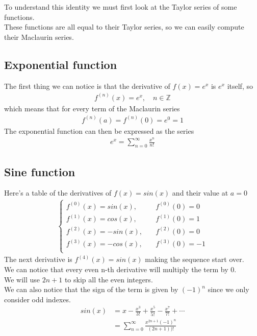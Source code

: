 \documentclass{article}
\begin{document}
To understand this identity we must first look at the Taylor series of some functions.
\\
These functions are all equal to their Taylor series, so we can easily compute their Maclaurin series.

\subsection{Exponential function}

The first thing we can notice is that the derivative of \(f(x)=e^x\) is \(e^x\) itself, so
\begin{align*}
	f^{(n)}(x)=e^x,
	\quad n\in\mathds{Z}
\end{align*}
which means that for every term of the Maclaurin series
\begin{align*}
	f^{(n)}(a)=f^{(n)}(0)=e^0=1
\end{align*}
The exponential function can then be expressed as the series
\begin{align*}
	e^x=\sum_{n=0}^{\infty}\frac{x^n}{n!}
\end{align*}

\pagebreak

\subsection{Sine function}

Here's a table of the derivatives of \(f(x)=sin(x)\) and their value at \(a=0\)
\begin{align*}
	\begin{cases}
		f^{(0)}(x)=sin(x), \quad &f^{(0)}(0)=0 \\
		f^{(1)}(x)=cos(x), \quad &f^{(1)}(0)=1 \\
		f^{(2)}(x)=-sin(x),\quad &f^{(2)}(0)=0 \\
		f^{(3)}(x)=-cos(x),\quad &f^{(3)}(0)=-1\\
	\end{cases}
\end{align*}
The next derivative is \(f^{(4)}(x)=sin(x)\) making the sequence start over.
\\
We can notice that every even n-th derivative will multiply the term by \(0\).
\\
We will use \(2n+1\) to skip all the even integers.
\\
We can also notice that the sign of the term is given by \((-1)^n\) since we only consider odd indexes.
\begin{align*}
	sin(x)&=x-\frac{x^3}{3!}+\frac{x^5}{5!}-\frac{x^7}{7!}+\cdots
	\\
	&=\sum_{n=0}^{\infty}\frac{x^{2n+1}(-1)^n}{(2n+1))!}
\end{align*}
\end{document}
